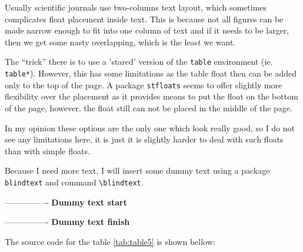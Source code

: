 \documentclass[
    draft
]{scrartcl}
\begin{document}
\begin{multicols}{2}
    

    Usually scientific journals use two-columns text layout, which sometimes
    complicates float placement inside text. This is because not all figures can
    be made narrow enough to fit into one column of text and if it needs to be
    larger, then we get some nasty overlapping, which is the least we want.

    The ``trick'' there is to use a 'stared' version of the \verb|table|
    environment (ie. \verb|table*|). However, this has some limitations as the
    table float then can be added only to the top of the page. A package
    \verb|stfloats| seems to offer slightly more flexibility over the placement
    as it provides means to put the float on the bottom of the page, however,
    the float still can not be placed in the middle of the page.

    In my opinion these options are the only one which look really good, so I do
    not see any limitations here, it is just it is slightly harder to deal with
    such floats than with simple floats.

    Because I need more text, I will insert some dummy text using a package
    \verb|blindtext| and command \verb|\blindtext|.

    ----------------
    \textbf{Dummy text start}

    \blindtext

    \blindtext

    ----------------
    \textbf{Dummy text finish}
\end{multicols}

The source code for the table \ref{tab:table5} is shown bellow:

\end{document}
